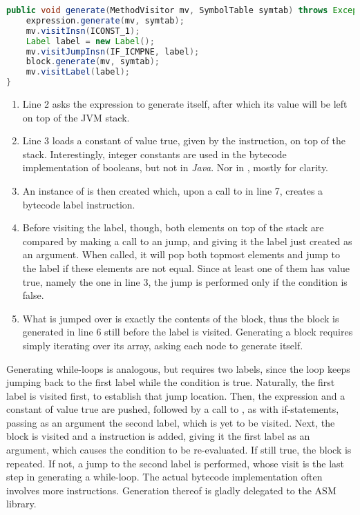 \begin{lstlisting}[language=Java,caption={Generating If-Statements.},label={alg:if}]
public void generate(MethodVisitor mv, SymbolTable symtab) throws Exception {
	expression.generate(mv, symtab);
	mv.visitInsn(ICONST_1);
	Label label = new Label();
	mv.visitJumpInsn(IF_ICMPNE, label);
	block.generate(mv, symtab);
	mv.visitLabel(label);
}
\end{lstlisting}

\begin{enumerate}
	\addtocounter{enumi}{1}
	\item Line 2 asks the expression to generate itself, after which its value will be left on top of the JVM stack.
	\item Line 3 loads a constant of value true, given by the  instruction, on top of the stack. Interestingly, integer constants are used in the bytecode implementation of booleans, but not in \emph{Java}. Nor in , mostly for clarity.
	\item An instance of  is then created which, upon a call to  in line 7, creates a bytecode label instruction.
	\item Before visiting the label, though, both elements on top of the stack are compared by making a call to an  jump, and giving it the label just created as an argument. When called, it will pop both topmost elements and jump to the label if these elements are not equal. Since at least one of them has value true, namely the one in line 3, the jump is performed only if the condition is false.
	\item What is jumped over is exactly the contents of the block, thus the block is generated in line 6 still before the label is visited. Generating a block requires simply iterating over its  array, asking each node to generate itself.
\end{enumerate}

Generating while-loops is analogous, but requires two labels, since the loop keeps jumping back to the first label while the condition is true. Naturally, the first label is visited first, to establish that jump location. Then, the expression and a constant of value true are pushed, followed by a call to , as with if-statements, passing as an argument the second label, which is yet to be visited. Next, the block is visited and a  instruction is added, giving it the first label as an argument, which causes the condition to be re-evaluated. If still true, the block is repeated. If not, a jump to the second label is performed, whose visit is the last step in generating a while-loop. The actual bytecode implementation often involves more instructions. Generation thereof is gladly delegated to the ASM library.

